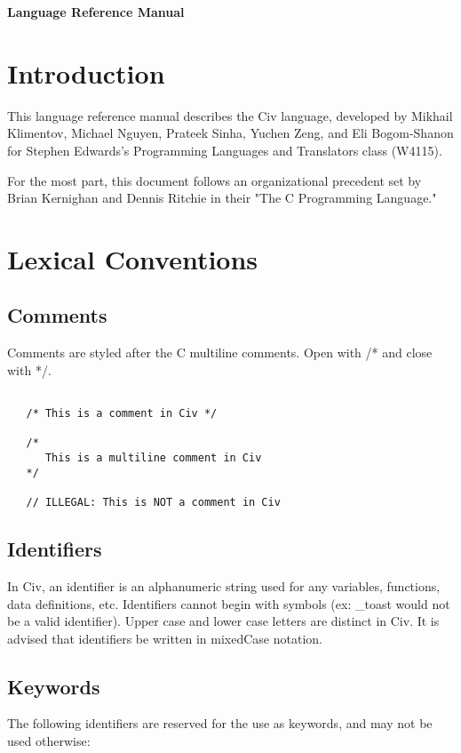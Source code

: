\documentclass[a4paper]{article}
\def \authors{Mikhail Klimentov, Michael Nguyen, Prateek Sinha, Yuchen Zeng, and Eli Bogom-Shanon }
\begin{document}
\textbf{\huge{Language Reference Manual}}

\section{Introduction}

This language reference manual describes the Civ language, developed by \authors for Stephen Edwards's Programming Languages and Translators class (W4115). 

For the most part, this document follows an organizational precedent set by Brian Kernighan and Dennis Ritchie in their "The C Programming Language." 

\section{Lexical Conventions}

\subsection{Comments}

Comments are styled after the C multiline comments. Open with /* and close with */.


{\selectfont
\begin{lstlisting} 

   /* This is a comment in Civ */
  
   /*
      This is a multiline comment in Civ
   */
    
   // ILLEGAL: This is NOT a comment in Civ
\end{lstlisting}
}

\subsection{Identifiers}

In Civ, an identifier is an alphanumeric string used for any variables, functions, data definitions, etc. Identifiers cannot begin with symbols (ex: \_toast would not be a valid identifier). Upper case and lower case letters are distinct in Civ. It is advised that identifiers be written in mixedCase notation.

\subsection{Keywords}

The following identifiers are reserved for the use as keywords, and may not be used otherwise:
\end{document}
